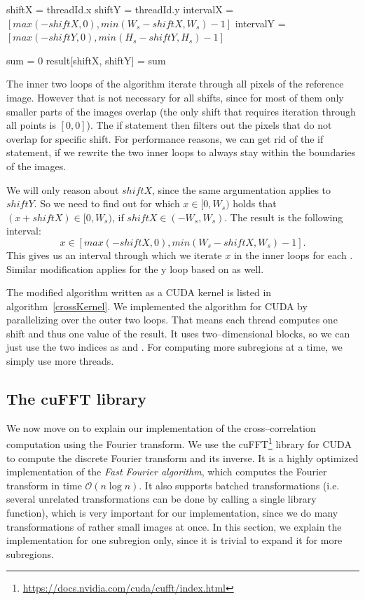 \begin{algorithm}
	\caption{Pseudocode of CUDA kernel that computes cross--correlation.}
	\label{crossKernel}
	
	shiftX = threadId.x\;
	shiftY = threadId.y\;
	intervalX = $[max(-shiftX, 0), min(W_s - shiftX, W_s) - 1]$\;
	intervalY = $[max(-shiftY, 0), min(H_s - shiftY, H_s) - 1]$\;
	
	sum = 0\;
	result[shiftX, shiftY] = sum\;
	
\end{algorithm}

The inner two loops of the algorithm iterate through all pixels of the reference image. However that is not necessary for all shifts, since for most of them only smaller parts of the images overlap (the only shift that requires iteration through all points is $[0,0]$). The if statement then filters out the pixels that do not overlap for specific shift. For performance reasons, we can get rid of the if statement, if we rewrite the two inner loops to always stay within the boundaries of the images.

We will only reason about $shiftX$, since the same argumentation applies to $shiftY$. So we need to find out for which $x \in [0, W_s)$ holds that $(x + shiftX) \in [0, W_s)$, if $shiftX \in (-W_s, W_s)$. The result is the following interval:
\[
x \in [max(-shiftX, 0), min(W_s - shiftX, W_s) - 1].
\]
This gives us an interval through which we iterate $x$ in the inner loops for each . Similar modification applies for the y loop based on  as well.

The modified algorithm written as a CUDA kernel is listed in algorithm~\ref{crossKernel}. We implemented the algorithm for CUDA by parallelizing over the outer two loops. That means each thread computes one shift and thus one value of the result. It uses two--dimensional blocks, so we can just use the two indices as  and . For computing more subregions at a time, we simply use more threads.

\subsection{The cuFFT library}
We now move on to explain our implementation of the cross--correlation computation using the Fourier transform. We use the cuFFT\footnote{\url{https://docs.nvidia.com/cuda/cufft/index.html}} library for CUDA to compute the discrete Fourier transform and its inverse. It is a highly optimized implementation of the \emph{Fast Fourier algorithm}, which computes the Fourier transform in time $\mathcal{O}(n \log n)$. It also supports batched transformations (i.e. several unrelated transformations can be done by calling a single library function), which is very important for our implementation, since we do many transformations of rather small images at once. In this section, we explain the implementation for one subregion only, since it is trivial to expand it for more subregions.


